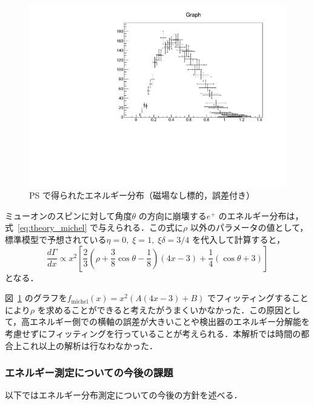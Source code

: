 \begin{figure}[H]
\begin{minipage}{0.4\columnwidth}
\includegraphics[height=\columnwidth,angle=-90]{figure/ikemitsu/michel_PS_gosa.pdf}
\caption{PS で得られたエネルギー分布（磁場なし標的，誤差付き）}
\label{michel_PS_gosa} 
\end{minipage}
\end{figure}
  
ミューオンのスピンに対して角度$\theta$ の方向に崩壊する$e^{+}$ のエネルギー分布は，式~\eqref{eq:theory_michel} で与えられる．この式に$\rho$ 以外のパラメータの値として，標準模型で予想されている$\eta = 0 , \;\xi = 1 , \;\xi \delta = 3/4$ を代入して計算すると，
\[\frac{d\Gamma}{dx} \propto x^{2} [\frac{2}{3}(\rho + \frac{3}{8}\cos \theta - \frac{1}{8})(4x-3) + \frac{1}{4}(\cos \theta + 3)]\]
となる．

図~\ref{michel_PS_gosa} のグラフを$f_{\mathrm{michel}}(x) = x^{2} (A(4x -3) + B)$ でフィッティングすることにより$\rho$ を求めることができると考えたがうまくいかなかった．この原因として，高エネルギー側での横軸の誤差が大きいことや検出器のエネルギー分解能を考慮せずにフィッティングを行っていることが考えられる．本解析では時間の都合上これ以上の解析は行なわなかった．

\subsubsection{エネルギー測定についての今後の課題}
以下ではエネルギー分布測定についての今後の方針を述べる．

